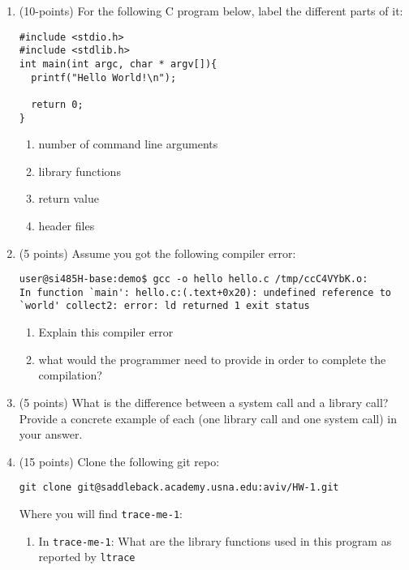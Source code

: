 \documentclass{article}[9pt]
\begin{document}
\begin{enumerate}
\item (10-points) For the following C program below, label the different parts of it:
\begin{verbatim}
#include <stdio.h>
#include <stdlib.h>
int main(int argc, char * argv[]){
  printf("Hello World!\n");

  return 0;
}
\end{verbatim}
\begin{enumerate}
\item number of command line arguments

\item library functions

\item return value

\item header files
\end{enumerate}

\item (5 points) Assume you got the following compiler error:
\begin{verbatim}
user@si485H-base:demo$ gcc -o hello hello.c /tmp/ccC4VYbK.o:
In function `main': hello.c:(.text+0x20): undefined reference to `world' collect2: error: ld returned 1 exit status
\end{verbatim}

\begin{enumerate}
\item Explain this compiler error

\item what would the programmer need to provide in order to complete the compilation?
\end{enumerate}

\item (5 points) What is the difference between a system call and a library call?
Provide a concrete example of each (one library call and one
system call) in your answer.

\item (15 points) Clone the following git repo:
\begin{verbatim}
git clone git@saddleback.academy.usna.edu:aviv/HW-1.git
\end{verbatim}
Where you will find \texttt{trace-me-1}:

\begin{enumerate}
\item In \texttt{trace-me-1}: What are the library functions used in this program as reported by \texttt{ltrace}


\end{enumerate}
\end{enumerate}
\end{document}

